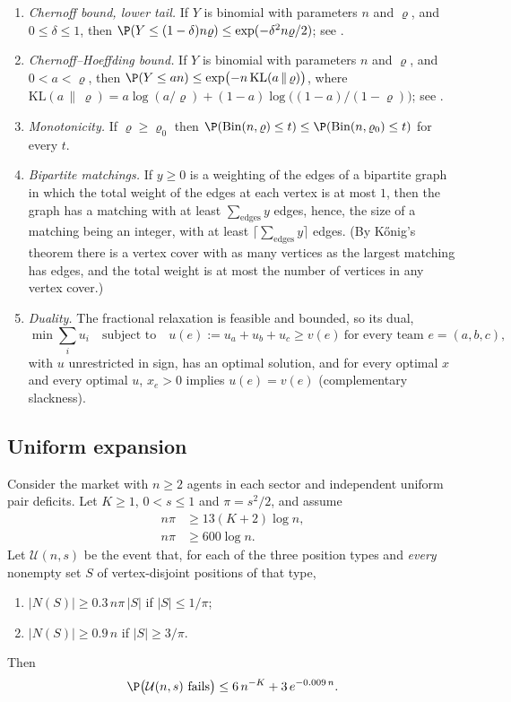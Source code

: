\begin{enumerate}
\item[\textup{(C1)}] \emph{Chernoff bound, lower tail.} If $Y$ is binomial with parameters
$n$ and $\varrho$, and $0\le\delta\le1$, then
$\P(Y\le(1-\delta)n\varrho)\le\exp(-\delta^2n\varrho/2)$; see \cite{BLM13}.
\item[\textup{(C2)}] \emph{Chernoff--Hoeffding bound.} If $Y$ is binomial with parameters
$n$ and $\varrho$, and $0<a<\varrho$, then
$\P(Y\le an)\le\exp\bigl(-n\,\mathrm{KL}(a\,\|\,\varrho)\bigr)$, where
$\mathrm{KL}(a\,\|\,\varrho)=a\log(a/\varrho)+(1-a)\log\bigl((1-a)/(1-\varrho)\bigr)$; see
\cite{BLM13}.
\item[\textup{(C3)}] \emph{Monotonicity.} If $\varrho\ge\varrho_0$ then
$\P(\mathrm{Bin}(n,\varrho)\le t)\le\P(\mathrm{Bin}(n,\varrho_0)\le t)$ for every $t$.
\item[\textup{(M)}] \emph{Bipartite matchings.} If $y\ge0$ is a weighting of the edges of
a bipartite graph in which the total weight of the edges at each vertex is at most $1$,
then the graph has a matching with at least $\sum_{\text{edges}}y$ edges, hence, the size
of a matching being an integer, with at least $\lceil\sum_{\text{edges}}y\rceil$ edges.
(By K\H{o}nig's theorem there is a vertex cover with as many vertices as the largest
matching has edges, and the total weight is at most the number of vertices in any vertex
cover.)
\item[\textup{(LP)}] \emph{Duality.} The fractional relaxation is feasible and bounded, so
its dual,
\[
\min\sum_iu_i\quad\text{subject to}\quad u(e):=u_a+u_b+u_c\ge v(e)\ \text{for every team }
e=(a,b,c),
\]
with $u$ unrestricted in sign, has an optimal solution, and for every optimal $x$ and every
optimal $u$, $x_e>0$ implies $u(e)=v(e)$ (complementary slackness).
\end{enumerate}

\subsection{Uniform expansion}\label{sec:variance-expansion}

\begin{lemma}\label{lem:variance-expansion}
Consider the market with $n\ge2$ agents in each sector and independent uniform pair
deficits. Let $K\ge1$, $0<s\le1$ and $\pi=s^2/2$, and assume
\begin{align}
n\pi&\ge13(K+2)\log n, \tag{U1}\label{eq:variance-U1}\\
n\pi&\ge600\log n. \tag{U2}\label{eq:variance-U2}
\end{align}
Let $\mathcal U(n,s)$ be the event that, for each of the three position types and
\emph{every} nonempty set $S$ of vertex-disjoint positions of that type,
\begin{enumerate}
\item[\textup{(a)}] $|N(S)|\ge0.3\,n\pi\,|S|$ if $|S|\le1/\pi$;
\item[\textup{(b)}] $|N(S)|\ge0.9\,n$ if $|S|\ge3/\pi$.
\end{enumerate}
Then
\[
\P\bigl(\mathcal U(n,s)\text{ fails}\bigr)\le6\,n^{-K}+3\,e^{-0.009\,n}.
\]
\end{lemma}

